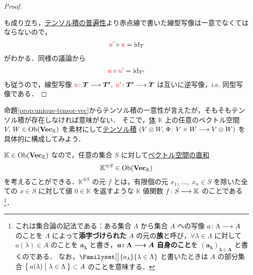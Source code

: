 \documentclass[rep_main]{subfiles}
\begin{document}
\begin{proof}
\begin{center}
	\end{center}
	も成り立ち，\hyperref[def:tensor-vec]{テンソル積の普遍性}より赤点線で書いた線型写像は一意でなくてはならないので，
	\begin{align}
		\textcolor{red}{u'} \circ \textcolor{red}{u} = \mathrm{id}_T
	\end{align}
	がわかる．同様の議論から
	\begin{align}
		\textcolor{red}{u} \circ \textcolor{red}{u'} = \mathrm{id}_{T'}
	\end{align}
	も従うので，線型写像 $\textcolor{red}{u} \colon \bm{T} \longrightarrow \bm{T'},\; \textcolor{red}{u'} \colon \bm{T'} \longrightarrow \bm{T}$ は互いに逆写像，i.e. 同型写像である．
\end{proof}


命題\ref{prop:unique-tensor-vec}からテンソル積の一意性が言えたが，そもそもテンソル積が存在しなければ意味がない．
そこで，\hyperref[ax.ring]{体} $\mathbb{K}$ 上の任意のベクトル空間 $V,\, W \in \mathrm{Ob}(\bm{\mathrm{Vec}_{\mathbb{K}}})$ を素材にして\hyperref[def:tensor-vec]{テンソル積} $(V \otimes W,\, \Phi \colon V \times W \longrightarrow V \otimes W)$ を具体的に構成してみよう．

$\mathbb{K} \in \mathrm{Ob}(\bm{\mathrm{Vec}_{\mathbb{K}}})$ なので，任意の集合 $S$ に対して\hyperref[prop:sum-vect]{ベクトル空間の直和}
\begin{align}
	\mathbb{K}^{\oplus S} \in \mathrm{Ob}(\bm{\mathrm{Vec}_{\mathbb{K}}})
\end{align}
を考えることができる．$\mathbb{K}^{\oplus S}$ の元 $f$ とは，有限個の元 $x_1,\, \dots,\; x_n \in S$ を除いた全ての $x \in S$ に対して値 $0 \in \mathbb{K}$ を返すような $\mathbb{K}$ 値関数
$f \colon S \longrightarrow \mathbb{K}$ のことである
\footnote{これは集合論の記法である：ある集合 $\Lambda$ から集合 $A$ への写像 $a \colon \Lambda \longrightarrow A$ のことを $\Lambda$ によって\textbf{添字づけられた} $A$ の元の\textbf{族}と呼び，$\forall \lambda \in \Lambda$ に対して $a(\lambda) \in A$ のことを $\bm{a_\lambda}$ と書き，$\bm{a \colon \Lambda \longrightarrow A}$ \textbf{自身のこと}を $\bm{(a_\lambda)_{\lambda \in \Lambda}}$ と書くのである．
なお，$\Familyset[\big]{a_\lambda}{\lambda \in \Lambda}$ と書いたときは $A$ の部分集合 $\bigl\{\, a(\lambda) \bigm| \lambda \in \Lambda \,\bigr\} \subset A$ のことを意味する．}．
\end{document}
